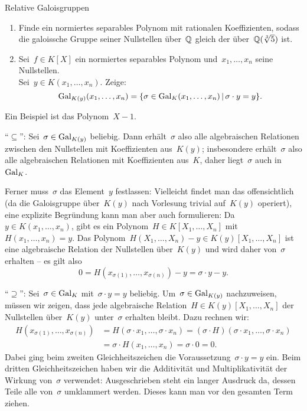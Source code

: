\documentclass{algblatt}
\begin{document}
\begin{aufgabe}{Relative Galoisgruppen}
\begin{enumerate}
\item Finde ein normiertes separables Polynom mit rationalen Koeffizienten,
sodass die galoissche Gruppe seiner Nullstellen über~$\mathbb{Q}$ gleich der
über~$\mathbb{Q}(\sqrt[3]{5})$ ist.
\item Sei~$f \in K[X]$ ein normiertes separables Polynom und~$x_1,\ldots,x_n$
seine Nullstellen. \\ Sei~$y \in K(x_1,\ldots,x_n)$. Zeige:
\[ \mathrm{Gal}_{K(y)}(x_1,\ldots,x_n) = \{ \sigma \in \mathrm{Gal}_K(x_1,\ldots,x_n) \,|\,
\sigma \cdot y = y \}. \]
\end{enumerate}

\begin{loesungE}
\item Ein Beispiel ist das Polynom~$X - 1$. 

\item "`$\subseteq$"': Sei~$\sigma \in \mathrm{Gal}_{K(y)}$ beliebig. Dann
erhält~$\sigma$ also alle algebraischen Relationen zwischen den Nullstellen mit
Koeffizienten aus~$K(y)$; insbesondere erhält~$\sigma$ also alle algebraischen
Relationen mit Koeffizienten aus~$K$, daher liegt~$\sigma$ auch in~$\mathrm{Gal}_K$.

Ferner muss~$\sigma$ das Element~$y$ festlassen: Vielleicht findet man das
offensichtlich (da die Galoisgruppe über~$K(y)$ nach Vorlesung trivial
auf~$K(y)$ operiert), eine explizite Begründung kann man aber auch formulieren:
Da~$y \in K(x_1,\ldots,x_n)$, gibt es ein Polynom~$H \in K[X_1,\ldots,X_n]$
mit~$H(x_1,\ldots,x_n) = y$. Das Polynom~$H(X_1,\ldots,X_n) - y \in
K(y)[X_1,\ldots,X_n]$ ist eine algebraische Relation der Nullstellen
über~$K(y)$ und wird daher von~$\sigma$ erhalten -- es gilt also
\[ 0 = H(x_{\sigma(1)},\ldots,x_{\sigma(n)}) - y = \sigma \cdot y - y. \]

"`$\supseteq$"': Sei~$\sigma \in \mathrm{Gal}_K$ mit~$\sigma \cdot y = y$ beliebig.
Um~$\sigma \in \mathrm{Gal}_{K(y)}$ nachzuweisen, müssen wir zeigen, dass jede algebraische
Relation~$H \in K(y)[X_1,\ldots,X_n]$ der Nullstellen über~$K(y)$
unter~$\sigma$ erhalten bleibt. Dazu rechnen wir:
\begin{align*}
  H(x_{\sigma(1)},\ldots,x_{\sigma(n)}) &=
  H(\sigma \cdot x_1,\ldots,\sigma \cdot x_n) =
  (\sigma \cdot H)(\sigma \cdot x_1,\ldots,\sigma \cdot x_n) \\
  &= \sigma \cdot H(x_1,\ldots,x_n) = \sigma \cdot 0 = 0.
\end{align*}
Dabei ging beim zweiten Gleichheitszeichen die Voraussetzung~$\sigma \cdot y =
y$ ein. Beim dritten Gleichheitszeichen haben wir die Additivität und
Multiplikativität der Wirkung von~$\sigma$ verwendet: Ausgeschrieben steht ein
langer Ausdruck da, dessen Teile alle von~$\sigma$ umklammert werden. Dieses
kann man vor den gesamten Term ziehen.
\end{loesungE}
\end{aufgabe}
\end{document}
